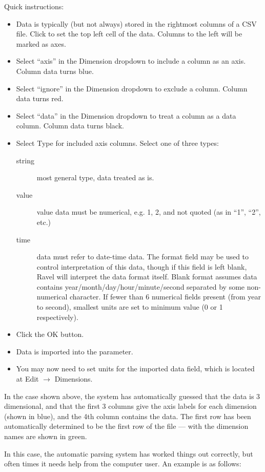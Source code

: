 Quick instructions: 
\begin{itemize}
\item Data is typically (but not always) stored in the rightmost columns
of a CSV file. Click to set the top left cell of the data. Columns
to the left will be marked as axes. 
\item Select ``axis'' in the Dimension dropdown to include a column as
an axis. Column data turns blue. 
\item Select ``ignore'' in the Dimension dropdown to exclude a column.
Column data turns red. 
\item Select ``data'' in the Dimension dropdown to treat a column as a
data column. Column data turns black. 
\item Select Type for included axis columns. Select one of three types: 
\begin{description}
\item [{string}] most general type, data treated as is. 
\item [{value}] value data must be numerical, e.g. 1, 2, and not quoted
(as in ``1'', ``2'', etc.)
\item [{time}] data must refer to date-time data. The format field may
be used to control interpretation of this data, though if this field
is left blank, Ravel will interpret the data format itself. Blank
format assumes data contains year/month/day/hour/minute/second separated
by some non-numerical character. If fewer than 6 numerical fields
present (from year to second), smallest units are set to minimum value
(0 or 1 respectively). 
\end{description}
\item Click the OK button. 
\item Data is imported into the parameter. 
\item You may now need to set units for the imported data field, which is
located at Edit $\rightarrow$ Dimensions. 
\end{itemize}
In the case shown above, the system has automatically guessed that
the data is 3 dimensional, and that the first 3 columns give the axis
labels for each dimension (shown in blue), and the 4th column contains
the data. The first row has been automatically determined to be the
first row of the file --- with the dimension names are shown in green.

In this case, the automatic parsing system has worked things out correctly,
but often times it needs help from the computer user. An example is
as follows:
\begin{center}
\par\end{center}

